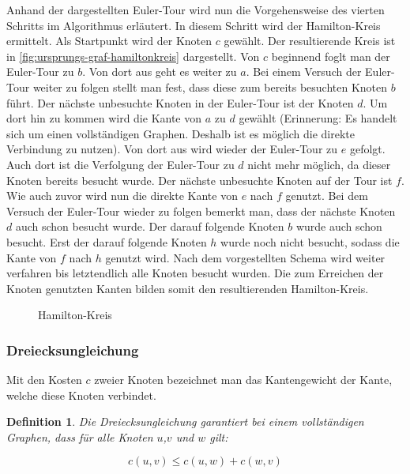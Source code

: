 \documentclass{article}
\newtheorem{mydef}{Definition}
\begin{document}
Anhand der dargestellten Euler-Tour wird nun die Vorgehensweise des vierten Schritts im Algorithmus erläutert. In diesem Schritt wird der Hamilton-Kreis ermittelt. Als Startpunkt wird der Knoten $c$ gewählt. Der resultierende Kreis ist in \autoref{fig:ursprungs-graf-hamiltonkreis} dargestellt. Von $c$ beginnend foglt man der Euler-Tour zu $b$. Von dort aus geht es weiter zu $a$. Bei einem Versuch der Euler-Tour weiter zu folgen stellt man fest, dass diese zum bereits besuchten Knoten $b$ führt. Der nächste unbesuchte Knoten in der Euler-Tour ist der Knoten $d$. Um dort hin zu kommen wird die Kante von $a$ zu $d$ gewählt (Erinnerung: Es handelt sich um einen vollständigen Graphen. Deshalb ist es möglich die direkte Verbindung zu nutzen). Von dort aus wird wieder der Euler-Tour zu $e$ gefolgt. Auch dort ist die Verfolgung der Euler-Tour zu $d$ nicht mehr möglich, da dieser Knoten bereits besucht wurde. Der nächste unbesuchte Knoten auf der Tour ist $f$. Wie auch zuvor wird nun die direkte Kante von $e$ nach $f$ genutzt. Bei dem Versuch der Euler-Tour wieder zu folgen bemerkt man, dass der nächste Knoten $d$ auch schon besucht wurde. Der darauf folgende Knoten $b$ wurde auch schon besucht. Erst der darauf folgende Knoten $h$ wurde noch nicht besucht, sodass die Kante von $f$ nach $h$ genutzt wird. Nach dem vorgestellten Schema wird weiter verfahren bis letztendlich alle Knoten besucht wurden. Die zum Erreichen der Knoten genutzten Kanten bilden somit den resultierenden Hamilton-Kreis.

\begin{figure}[H]
\centering
{}
\caption{Hamilton-Kreis}
\label{fig:ursprungs-graf-hamiltonkreis}
\end{figure}

\subsubsection{Dreiecksungleichung}
Mit den Kosten $c$ zweier Knoten bezeichnet man das Kantengewicht der  Kante, welche diese Knoten verbindet.
\begin{mydef}\label{thm:definition_dreiecksungleichung}
Die Dreiecksungleichung garantiert bei einem vollständigen Graphen, dass für alle Knoten $u$,$v$ und $w$ gilt:

\begin{equation}
c(u,v) \leq c(u,w) + c(w,v)
\end{equation}

\end{mydef}
\end{document}
